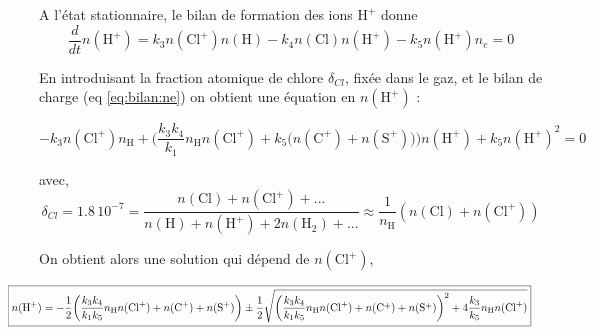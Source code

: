 A l'état stationnaire, le bilan de formation des ions $\mathrm{H}^+$ donne
\begin{equation}\label{eq:h+}
    \frac{d}{dt}n(\mathrm{H}^+) = k_3n(\mathrm{Cl}^+)n(\mathrm{H}) - k_4n(\mathrm{Cl})n(\mathrm{H}^+) - k_5 n(\mathrm{H}^+)n_e = 0
\end{equation}

En introduisant la fraction atomique de chlore $\delta_{Cl}$, fixée dans le gaz, et le bilan de charge (eq \ref{eq:bilan:ne}) on obtient une équation en $n(\mathrm{H}^+)$ :

\begin{equation}
    -k_3n(\mathrm{Cl}^+)n_{\mathrm{H}} + \bigg( \frac{k_3 k_4}{k_1} n_{\mathrm{H}} n(\mathrm{Cl}^+) + k_5 \big(n(\mathrm{C}^+)+ n(\mathrm{S}^+)\big) \bigg) n(\mathrm{H}^+) + k_5 n(\mathrm{H}^+)^2 = 0
\end{equation}

 avec,
\begin{equation}
    \delta_{Cl} = 1.8\,10^{-7} = \frac{n(\mathrm{Cl}) + n(\mathrm{Cl}^+) + ...}{n(\mathrm{H}) + n(\mathrm{H}^+) + 2n(\mathrm{H}_2) + ...} \approx \frac{1}{n_{\mathrm{H}}} (n(\mathrm{Cl}) + n(\mathrm{Cl}^+) )
\end{equation}

On obtient alors une solution qui dépend de $n(\mathrm{Cl}^+)$,

\begin{equation}
\hspace{-3em}
\resizebox{1.1\hsize}{!}{
    \boxed{n(\mathrm{H}^+) = -\frac{1}{2} \bigg( \frac{k_3 k_4}{k_1 k_5} n_{\mathrm{H}} n(\mathrm{Cl}^+) + n(\mathrm{C}^+)+ n(\mathrm{S}^+) \bigg) \pm \frac{1}{2} \sqrt{\bigg( \frac{k_3 k_4}{k_1 k_5} n_{\mathrm{H}} n(\mathrm{Cl}^+) + n(\mathrm{C}^+)+ n(\mathrm{S}^+) \bigg)^2 + 4\frac{k_3}{k_5}n_{\mathrm{H}} n(\mathrm{Cl}^+)}}
    }
\end{equation}


